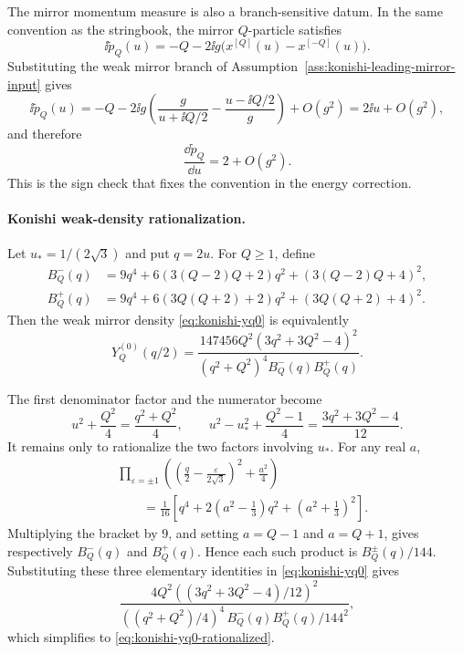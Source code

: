 The mirror momentum measure is also a branch-sensitive datum.  In the same
convention as the stringbook, the mirror \(Q\)-particle satisfies
\[
  \ii\widetilde p_Q(u)
  =
  -Q-2\ii g\bigl(x^{[Q]}(u)-x^{[-Q]}(u)\bigr).
\]
Substituting the weak mirror branch of
Assumption~\ref{ass:konishi-leading-mirror-input} gives
\[
  \ii\widetilde p_Q(u)
  =
  -Q-2\ii g\left(
    \frac{g}{u+\ii Q/2}
    -\frac{u-\ii Q/2}{g}
  \right)+O(g^2)
  =
  2\ii u+O(g^2),
\]
and therefore
\begin{equation}
  \frac{\dd\widetilde p_Q}{\dd u}=2+O(g^2).
  \label{eq:konishi-leading-mirror-measure}
\end{equation}
This is the sign check that fixes the convention in the energy correction.

\paragraph{Konishi weak-density rationalization.}
Let \(u_\ast=1/(2\sqrt3)\) and put \(q=2u\).  For \(Q\geq1\), define
\[
\begin{aligned}
  B_Q^-(q)
  &=
  9q^4+6(3(Q-2)Q+2)q^2+(3(Q-2)Q+4)^2,
\\
  B_Q^+(q)
  &=
  9q^4+6(3Q(Q+2)+2)q^2+(3Q(Q+2)+4)^2 .
\end{aligned}
\]
Then the weak mirror density \eqref{eq:konishi-yq0} is equivalently
\begin{equation}
  Y_Q^{(0)}(q/2)
  =
  \frac{147456Q^2(3q^2+3Q^2-4)^2}
       {(q^2+Q^2)^4B_Q^-(q)B_Q^+(q)} .
  \label{eq:konishi-yq0-rationalized}
\end{equation}

The first denominator factor and the numerator become
\[
  u^2+\frac{Q^2}{4}=\frac{q^2+Q^2}{4},
  \qquad
  u^2-u_\ast^2+\frac{Q^2-1}{4}
  =
  \frac{3q^2+3Q^2-4}{12}.
\]
It remains only to rationalize the two factors involving
\(u_\ast\).  For any real \(a\),
\[
\begin{aligned}
  &\prod_{\varepsilon=\pm1}
  \left(\left(\frac q2-\frac{\varepsilon}{2\sqrt3}\right)^2+\frac{a^2}{4}\right)
\\
  &\qquad
  =
  \frac{1}{16}
  \left[
    q^4+2\left(a^2-\frac13\right)q^2
    +\left(a^2+\frac13\right)^2
  \right].
\end{aligned}
\]
Multiplying the bracket by \(9\), and setting \(a=Q-1\) and \(a=Q+1\),
gives respectively \(B_Q^-(q)\) and \(B_Q^+(q)\).  Hence each such product
is \(B_Q^\pm(q)/144\).  Substituting these three elementary identities in
\eqref{eq:konishi-yq0} gives
\[
  \frac{
    4Q^2\left((3q^2+3Q^2-4)/12\right)^2
  }{
    ((q^2+Q^2)/4)^4\,B_Q^-(q)B_Q^+(q)/144^2
  },
\]
which simplifies to \eqref{eq:konishi-yq0-rationalized}.


